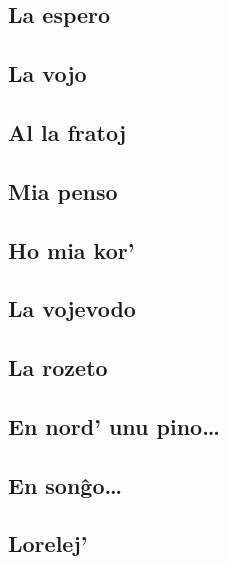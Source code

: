 \documentclass[a5paper,11pt,openany,twoside]{book}
\begin{document}
\subsection{La espero}
\label{laespero}


\subsection{La vojo}
\label{lavojo}


\subsection{Al la fratoj}
\label{allafratoj}


\subsection{Mia penso}
\label{miapenso}


\subsection{Ho mia kor'}
\label{homiakor}


\subsection{La vojevodo}
\label{vojevodo}


\subsection{La rozeto}
\label{rozeto}


\subsection{En nord' unu pino\dots}
\label{unupino}


\subsection{En son\^go\dots}
\label{songxo}


\subsection{Lorelej'}
\label{lorelej}

\end{document}
